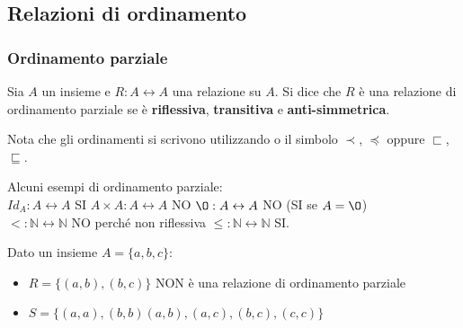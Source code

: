 \subsection{Relazioni di ordinamento}
\subsubsection{Ordinamento parziale}
\begin{definition}
    Sia $A$ un insieme e $R: A \leftrightarrow A$ una relazione su $A$. Si dice che $R$ è una relazione di ordinamento parziale se è \textbf{riflessiva}, \textbf{transitiva} e \textbf{anti-simmetrica}.
\end{definition}
\begin{note}
    Nota che gli ordinamenti si scrivono utilizzando o il simbolo $\prec$, $\preceq$ oppure $\sqsubset$, $\sqsubseteq$.
\end{note}
\begin{example}
Alcuni esempi di ordinamento parziale:\\
$Id_A: A \leftrightarrow A$ SI \hspace{.7cm} $A \times A: A \leftrightarrow A$ NO  \hspace{.7cm} $\O: A \leftrightarrow A$ NO (SI se $A = \O $) \\
$<: \mathbb{N} \leftrightarrow \mathbb{N}$ NO perché non riflessiva \hspace{.7cm} $\leq: \mathbb{N} \leftrightarrow \mathbb{N}$ SI.
\end{example}
\begin{example}
	Dato un insieme $A = \{a,b,c\} $:
	\begin{itemize}
		\item $R=\{(a,b), (b,c)\}$ NON è una relazione di ordinamento parziale
		\item $S = \{(a,a),(b,b)(a,b),(a,c),(b,c),(c,c)\}$
	\end{itemize} 
\end{example}

